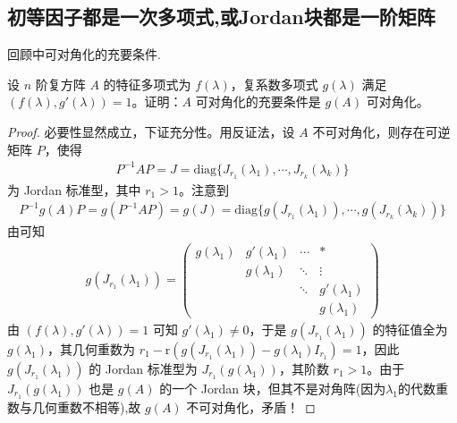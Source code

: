 \documentclass[../../main.tex]{subfiles}%
\begin{document}
\subsection{初等因子都是一次多项式,或Jordan块都是一阶矩阵}

回顾中可对角化的充要条件.

\begin{proposition}\label{proposition:矩阵可对角化关于多项式的充要条件1}
设 $n$ 阶复方阵 $A$ 的特征多项式为 $f(\lambda)$，复系数多项式 $g(\lambda)$ 满足 $(f(\lambda),g'(\lambda)) = 1$。证明：$A$ 可对角化的充要条件是 $g(A)$ 可对角化。
\end{proposition}
\begin{proof}
必要性显然成立，下证充分性。用反证法，设 $A$ 不可对角化，则存在可逆矩阵 $P$，使得
\begin{align*}
P^{-1}AP = J = \mathrm{diag}\{J_{r_1}(\lambda_1),\cdots,J_{r_k}(\lambda_k)\}
\end{align*}
为 Jordan 标准型，其中 $r_1 > 1$。注意到
\begin{align*}
P^{-1}g(A)P = g(P^{-1}AP) = g(J) = \mathrm{diag}\{g(J_{r_1}(\lambda_1)),\cdots,g(J_{r_k}(\lambda_k))\}
\end{align*}
由可知   
\begin{align*}
g(J_{r_1}(\lambda_1))=\begin{pmatrix}
g(\lambda_1) & g'(\lambda_1) & \cdots & * \\
& g(\lambda_1) & \ddots & \vdots \\
& & \ddots & g'(\lambda_1) \\
& & & g(\lambda_1)
\end{pmatrix}
\end{align*}
由 $(f(\lambda),g'(\lambda)) = 1$ 可知 $g'(\lambda_1) \neq 0$，于是 $g(J_{r_1}(\lambda_1))$ 的特征值全为 $g(\lambda_1)$，其几何重数为 $r_1 - \mathrm{r}(g(J_{r_1}(\lambda_1)) - g(\lambda_1)I_{r_1}) = 1$，因此 $g(J_{r_1}(\lambda_1))$ 的 Jordan 标准型为 $J_{r_1}(g(\lambda_1))$，其阶数 $r_1 > 1$。由于 $J_{r_1}(g(\lambda_1))$ 也是 $g(A)$ 的一个 Jordan 块，但其不是对角阵(因为$\lambda_1$的代数重数与几何重数不相等),故 $g(A)$ 不可对角化，矛盾！
\end{proof}
\end{document}
